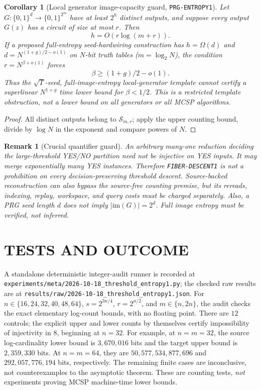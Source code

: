\documentclass[11pt]{article}
\newtheorem{corollary}[theorem]{Corollary}
\newtheorem{remark}[theorem]{Remark}
\begin{document}
\begin{corollary}[Local generator image-capacity guard,
\texttt{PRG-ENTROPY1}]
Let \(G:\{0,1\}^d\to\{0,1\}^{2^m}\) have at least
\(2^{h}\) \emph{distinct outputs}, and suppose every
output \(G(z)\) has a circuit of size at most \(r\).
Then
\[
 \boxed{h=O(r\log(m+r)).}
\]
If a proposed full-entropy seed-hardwiring construction
has \(h=\Omega(d)\) and \(d=N^{(1+g)/2-o(1)}\)
on \(N\)-bit truth tables (\(m=\log_2N\)), the
condition \(r=N^{\beta+o(1)}\) forces
\[
 \boxed{\beta\ge(1+g)/2-o(1).}
\]
Thus the \(\sqrt{T}\)-seed, full-image-entropy
local-generator template cannot certify a
superlinear \(N^{1+g}\) time lower bound for
\(\beta<1/2\).  This is a \emph{restricted
template obstruction}, not a lower bound on
all generators or all MCSP algorithms.
\end{corollary}
\begin{proof}
All distinct outputs belong to
\(\mathcal S_{m,r}\); apply the upper counting
bound, divide by \(\log N\) in the exponent
and compare powers of \(N\).
\end{proof}

\begin{remark}[Crucial quantifier guard]
An arbitrary many-one reduction deciding the large-threshold
YES/NO partition need \emph{not} be injective on YES inputs.
It may merge exponentially many YES instances.  Therefore
\texttt{FIBER-DESCENT1} is not a prohibition on every
decision-preserving threshold descent.  Source-backed
reconstruction can also bypass the source-free counting premise,
but its rereads, indexing, replay, workspace, and query
costs must be charged separately.  Also, a PRG seed length \(d\)
does \emph{not} imply \(|\mathrm{im}(G)|=2^d\).
Full image entropy must be verified, not inferred.
\end{remark}

\section{TESTS AND OUTCOME}
A standalone deterministic integer-audit runner is recorded at
\texttt{experiments/meta/2026-10-18\_threshold\_entropy1.py};
the checked raw results are at
\texttt{results/raw/2026-10-18\_threshold\_entropy1.json}.
For \(n\in\{16,24,32,40,48,64\}\),
\(s=2^{3n/4}\), \(r=2^{n/2}\),
and \(m\in\{n,2n\}\), the audit checks the exact
elementary log-count bounds, with no floating point.
There are \(12\) controls; the explicit upper and lower
counts by themselves certify impossibility of injectivity in
\(8\), beginning at \(n=32\).
For example, at \(n=m=32\), the
source log-cardinality lower bound is \(3{,}670{,}016\)
bits and the target upper bound is \(2{,}359{,}330\)
bits.  At \(n=m=64\), they are
\(50{,}577{,}534{,}877{,}696\) and
\(292{,}057{,}776{,}194\) bits, respectively.
The remaining finite cases are inconclusive,
not counterexamples to the asymptotic theorem.
These are counting tests, \emph{not} experiments
proving MCSP machine-time lower bounds.
\end{document}

